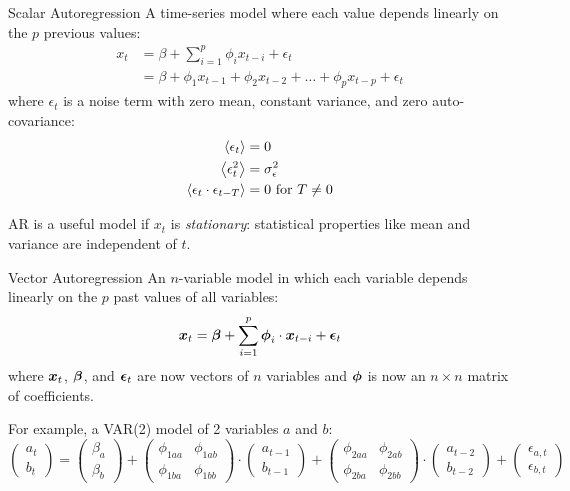 \begin{frame}{Scalar Autoregression}
    A time-series model where each value depends linearly on the $p$ 
    previous values:
    \begin{align*} x_t
        &= \beta + \sum_{i=1}^p \phi_i x_{t-i} + \epsilon_t \\
        &= \beta + \phi_1 x_{t-1} + \phi_2 x_{t-2} + \ldots + \phi_p x_{t-p} + \epsilon_t
    \end{align*}
    where $\epsilon_t$ is a noise term with zero mean, constant variance,
    and zero auto-covariance:
    \begin{align*}
        \left< \epsilon_t \right> &= 0 \\
        \left< \epsilon_t^2 \right> &= \sigma_\epsilon^2 \\
        \left< \epsilon_t \cdot \epsilon_{t-T} \right> &= 0 \text{ for } T \neq 0
    \end{align*}
     
     AR is a useful model if $x_t$ is \emph{stationary}: statistical 
     properties like mean and variance are independent of $t$.
\end{frame}

\begin{frame}{Vector Autoregression}
    An $n$-variable model in which each variable depends linearly on the
    $p$ past values of all variables:
    \[ \boldsymbol{x}_t
        = \boldsymbol{\beta} + \sum_{i=1}^{p} \boldsymbol{\phi}_{i} \cdot \boldsymbol{x}_{t-i} + \boldsymbol{\epsilon}_t
     \]
     where $\boldsymbol{x}_t$, $\boldsymbol{\beta}$, and $\boldsymbol{\epsilon}_t$ are now 
     vectors of $n$ variables and $\boldsymbol{\phi}$ is now an $n \times n$ 
     matrix of coefficients.
    
    For example, a VAR(2) model of 2 variables $a$ and $b$:
    \[ 
        \begin{pmatrix} a_t \\ b_t \end{pmatrix} = 
        \begin{pmatrix} \beta_{a} \\ \beta_{b} \end{pmatrix} +
        \begin{pmatrix}
            \phi_{1aa} & \phi_{1ab} \\
            \phi_{1ba} & \phi_{1bb}
        \end{pmatrix} \cdot 
        \begin{pmatrix} a_{t-1} \\ b_{t-1} \end{pmatrix} + 
        \begin{pmatrix}
            \phi_{2aa} & \phi_{2ab} \\
            \phi_{2ba} & \phi_{2bb}
        \end{pmatrix} \cdot 
        \begin{pmatrix} a_{t-2} \\ b_{t-2} \end{pmatrix} +
        \begin{pmatrix} \epsilon_{a,t} \\ \epsilon_{b,t} \end{pmatrix}
    \]
\end{frame}

